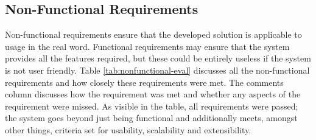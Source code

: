 \subsection{Non-Functional Requirements}
Non-functional requirements ensure that the developed solution is applicable to usage in the real word. Functional requirements may ensure that the system provides all the features required, but these could be entirely useless if the system is not user friendly. Table \ref{tab:nonfunctional-eval} discusses all the non-functional requirements and how closely these requirements were met. The comments column discusses how the requirement was met and whether any aspects of the requirement were missed. As visible in the table, all requirements were passed; the system goes beyond just being functional and additionally meets, amongst other things, criteria set for usability, scalability and extensibility.

